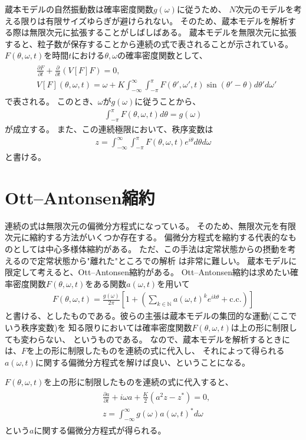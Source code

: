 \documentclass{jsarticle}
\begin{document}
蔵本モデルの自然振動数は確率密度関数$g(\omega)$に従うため、
$N$次元のモデルを考える限りは有限サイズゆらぎが避けられない。
そのため、蔵本モデルを解析する際は無限次元に拡張することがしばしばある。
蔵本モデルを無限次元に拡張すると、粒子数が保存することから連続の式で表されることが示されている。
$F(\theta,\omega,t)$を時間$t$における$\theta,\omega$の確率密度関数として、
\begin{align}
\begin{split}
&\frac{\partial F}{\partial t}+\frac{\partial}{\partial t}(V[F]F)=0,\\
&V[F](\theta,\omega,t)=\omega+K\int_{-\infty}^{\infty}\int_{-\pi}^{\pi} F(\theta',\omega',t)\sin(\theta'-\theta)d\theta'd\omega'
\end{split}
\end{align}
で表される。
このとき、$\omega$が$g(\omega)$に従うことから、
\begin{align}
\int_{-\pi}^{\pi}F(\theta,\omega,t)d\theta=g(\omega)
\end{align}
が成立する。
また、この連続極限において、秩序変数は
\begin{align}
z=\int_{-\infty}^{\infty}\int_{-\pi}^{\pi} F(\theta,\omega,t)e^{i\theta}d\theta d\omega
\end{align}
と書ける。

\section{Ott--Antonsen縮約}
連続の式は無限次元の偏微分方程式になっている。
そのため、無限次元を有限次元に縮約する方法がいくつか存在する。
偏微分方程式を縮約する代表的なものとしては中心多様体縮約がある。
ただ、この手法は定常状態からの摂動を考えるので定常状態から"離れた"ところでの解析
は非常に難しい。
蔵本モデルに限定して考えると、Ott--Antonsen縮約がある。
Ott--Antonsen縮約は求めたい確率密度関数$F(\theta,\omega,t)$をある関数$a(\omega,t)$を用いて
\begin{align}
F(\theta,\omega,t)=\frac{g(\omega)}{2\pi}\left[1+\left(\sum_{k\in\mathbb{N}}a(\omega,t)^{k}e^{ik\theta}+\mathrm{c.c.}\right)\right]
\end{align}
と書ける、としたものである。彼らの主張は蔵本モデルの集団的な運動(ここでいう秩序変数)を
知る限りにおいては確率密度関数$F(\theta,\omega,t)$は上の形に制限しても変わらない、
というものである。
なので、蔵本モデルを解析するときには、$F$を上の形に制限したものを連続の式に代入し、
それによって得られる$a(\omega,t)$に関する偏微分方程式を解けば良い、ということになる。

$F(\theta,\omega,t)$を上の形に制限したものを連続の式に代入すると、
\begin{align}
\begin{split}
&\frac{\partial a}{\partial t}+i\omega a+\frac{K}{2}(a^{2}z-z^{*})=0,\\
&z=\int_{-\infty}^{\infty}g(\omega)a(\omega,t)^{*}d\omega
\end{split}
\end{align}
という$a$に関する偏微分方程式が得られる。
\end{document}
